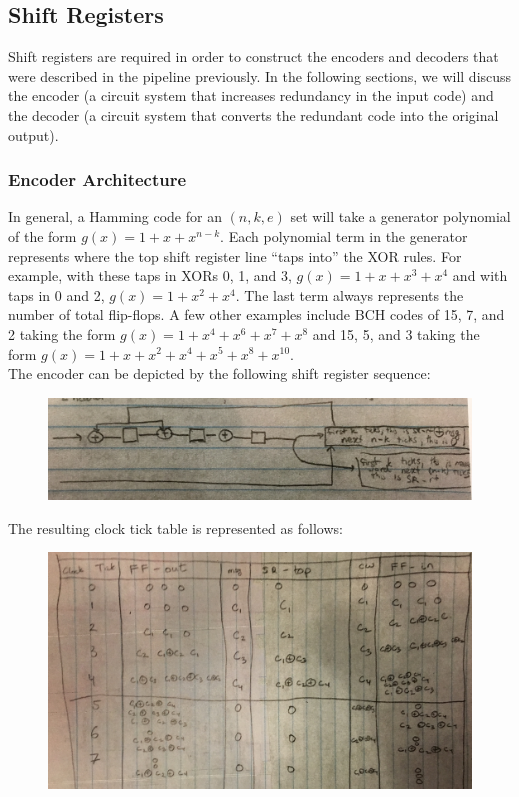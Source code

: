 \documentclass[11pt]{article}
\theoremstyle{definition}
\begin{document}
\subsection{Shift Registers}

Shift registers are required in order to construct the encoders and decoders that were described in the pipeline previously. In the following sections, we will discuss the encoder (a circuit system that increases redundancy in the input code) and the decoder (a circuit system that converts the redundant code into the original output). 

\subsubsection{Encoder Architecture}

In general, a Hamming code for an $(n, k, e)$ set will take a generator polynomial of the form $g(x) = 1 + x + x^{n-k}$. Each polynomial term in the generator represents where the top shift register line ``taps into'' the XOR rules. For example, with these taps in XORs 0, 1, and 3, $g(x) = 1 + x + x^3 + x^4$ and with taps in 0 and 2, $g(x) = 1 + x^2 + x^4$. The last term always represents the number of total flip-flops. A few other examples include BCH codes of 15, 7, and 2 taking the form $g(x) = 1 + x^4 + x^6 + x^7 + x^8$ and 15, 5, and 3 taking the form $g(x) = 1 + x + x^2 + x^4 + x^5 + x^8 + x^{10}$. \\

\noindent The encoder can be depicted by the following shift register sequence:

\begin{figure}[ht]
\includegraphics[width=\textwidth]{encoder.JPG}
\end{figure}

\noindent The resulting clock tick table is represented as follows:

\begin{figure}[ht]
\includegraphics[width=\textwidth]{encoder2.JPG}
\end{figure}
\end{document}

